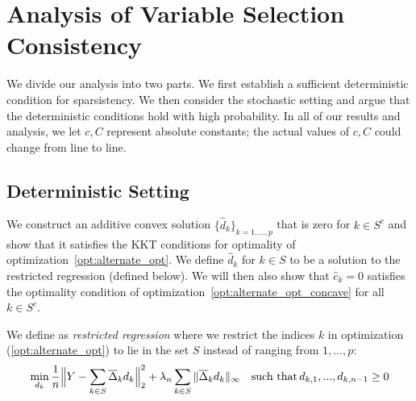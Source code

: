 \section{Analysis of Variable Selection Consistency}
\label{sec:finitesample}

We divide our analysis into two parts. We first establish a sufficient deterministic condition for sparsistency.  We then consider the
stochastic setting and argue that the deterministic conditions hold with high probability. In all of our results and analysis, we let $c, C$ represent absolute constants; the actual values of $c,C$ could change from line to line.

\subsection{Deterministic Setting}

We construct an additive convex solution $\{\hat{d}_k\}_{k=1,...,p}$ that is zero for $k \in S^c$ and show that it satisfies the KKT conditions for optimality of optimization~\ref{opt:alternate_opt}. We define $\hat{d}_k$ for $k \in S$ to be a solution to the restricted regression (defined below). We will then also show that $\hat{c}_k = 0$ satisfies the optimality condition of optimization~\ref{opt:alternate_opt_concave} for all $k \in S^c$.

\begin{definition}
\label{def:restricted_regression}
We define as \emph{restricted regression} where we restrict the indices $k$ in
optimization (\ref{opt:alternate_opt}) to lie in the set $S$ instead of ranging from $1,...,p$:
\[
\min_{d_k} \frac{1}{n} \Big\| Y - \sum_{k \in S} \overline{\Delta}_k d_k \Big\|_2^2 + 
   \lambda_n \sum_{k \in S} \| \overline{\Delta}_k d_k \|_\infty \quad \textrm{such that} \, d_{k,1}, ..., d_{k,n-1} \geq 0
\]
\end{definition}


